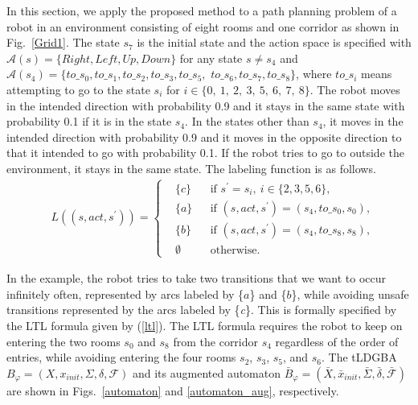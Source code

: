 In this section,
we apply the proposed method to a path planning problem of a robot in an environment consisting of eight rooms and one corridor as shown in Fig.\ \ref{Grid1}. The state $s_7$ is the initial state and the action space is specified with $\mathcal{A}(s) = \{ Right, Left, Up, Down \}$ for any state $s \neq s_4$ and $\mathcal{A}(s_4) = \{ to\_s_0, to\_s_1, to\_s_2, to\_s_3, to\_s_5, $ $to\_s_6, to\_s_7, to\_s_8 \}$, where $to\_s_i$ means attempting to go to the state $s_i$ for $i \in \{0,\ 1,\ 2,\ 3,\ 5,\ 6,\ 7,\ 8 \}$. The robot moves in the intended direction with probability 0.9 and it stays in the same state with probability 0.1 if it is in the state $s_4$. In the states other than $s_4$, it moves in the intended direction with probability 0.9 and it moves in the opposite direction to that it intended to go with probability 0.1. If the robot tries to go to outside the environment, it stays in the same state. The labeling function is as follows.
\begin{align*}
      & L((s, act, s^{\prime})) =
      \left\{
      \begin{aligned}
        & \{ c \} &  & \text{if }s^{\prime} = s_i,\ i \in \{ 2,3,5,6 \}, \nonumber \\
        & \{ a \} &  & \text{if }(s,act,s^{\prime})=(s_4,to\_s_0,s_0), \nonumber \\
        & \{ b \} &  & \text{if }(s,act,s^{\prime})=(s_4,to\_s_8, s_8), \nonumber \\
        & \emptyset &  & \text{otherwise}.
      \end{aligned}
      \right.
    \end{align*}

In the example, the robot tries to take two transitions that we want to occur infinitely often, represented by arcs labeled by \{$a$\} and \{$b$\}, while avoiding unsafe transitions represented by the arcs labeled by \{{\it c}\}. This is formally specified by the LTL formula given by (\ref{ltl}).
The LTL formula requires the robot to keep on entering the two rooms $s_0$ and $s_8$ from the corridor $s_4$ regardless of the order of entries, while avoiding entering the four rooms $s_2$, $s_3$, $s_5$, and $s_6$.
The tLDGBA $B_{\varphi} = (X, x_{init},\Sigma,\delta,\mathcal{F})$ and its augmented automaton $\bar{B}_{\varphi} = (\bar{X},\bar{x}_{init},\bar{\Sigma},\bar{\delta},\bar{\mathcal{F}})$ are shown in Figs.\ \ref{automaton} and \ref{automaton_aug}, respectively.

